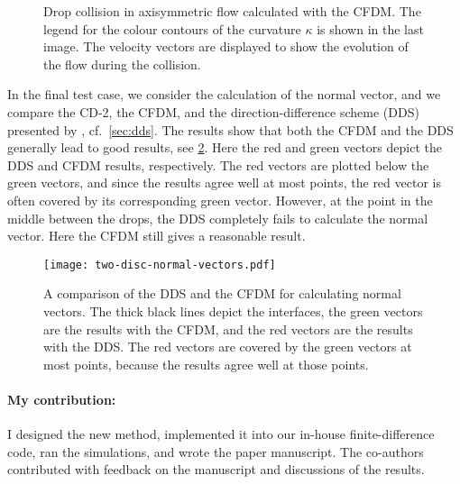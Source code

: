 \documentclass[11pt,b5paper,DIV=calc,BCOR1.3cm,headings=small,%
               footinclude=false,headsepline]{scrbook}
\begin{document}
\begin{figure}[tbp]
  \caption{Drop collision in axisymmetric flow calculated with the CFDM.  The
    legend for the colour contours of the curvature $\kappa$ is shown in the
    last image.  The velocity vectors are displayed to show the evolution of
    the flow during the collision.}
  \label{fig:C2}
\end{figure}

In the final test case, we consider the calculation of the normal vector, and
we compare the CD-2, the CFDM, and the direction-difference scheme (DDS)
presented by \citet{Macklin05}, cf.\ \cref{sec:dds}.  The results show that
both the CFDM and the DDS generally lead to good results, see \cref{fig:C3}.
Here the red and green vectors depict the DDS and CFDM results, respectively.
The red vectors are plotted below the green vectors, and since the results
agree well at most points, the red vector is often covered by its corresponding
green vector.  However, at the point in the middle between the drops, the DDS
completely fails to calculate the normal vector.  Here the CFDM still gives
a reasonable result.
\begin{figure}[tbp]
  \centering
  \texttt{[image: two-disc-normal-vectors.pdf]}
  \caption{A comparison of the DDS and the CFDM for calculating normal vectors.
    The thick black lines depict the interfaces, the green vectors are the
    results with the CFDM, and the red vectors are the results with the DDS.
    The red vectors are covered by the green vectors at most points, because
    the results agree well at those points.}
  \label{fig:C3}
\end{figure}

\paragraph{My contribution:}  I designed the new method, implemented it into
our in-house finite-difference code, ran the simulations, and wrote the paper
manuscript.  The co-authors contributed with feedback on the manuscript and
discussions of the results.

\clearpage
\end{document}
